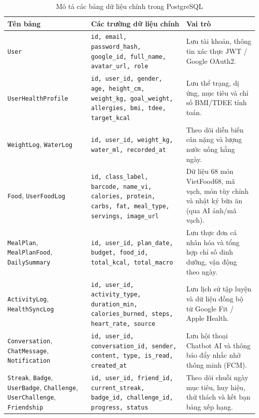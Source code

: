 \documentclass[../main.tex]{subfiles}
\begin{document}
\begin{table}[H]
    \centering
    \caption{Mô tả các bảng dữ liệu chính trong PostgreSQL}
    \label{tab:ch3_database}
    \begin{tabular}{|p{}|p{}|p{}|}
        \hline
        \rowcolor{primary!35}
        \textbf{Tên bảng} & \textbf{Các trường dữ liệu chính} & \textbf{Vai trò} \\
        \hline
        \texttt{User} & \texttt{id, email, password\_hash, google\_id, full\_name, avatar\_url, role} & Lưu tài khoản, thông tin xác thực JWT / Google OAuth2. \\
        \hline
        \texttt{UserHealthProfile} & \texttt{id, user\_id, gender, age, height\_cm, weight\_kg, goal\_weight, allergies, bmi, tdee, target\_kcal} & Lưu thể trạng, dị ứng, mục tiêu và chỉ số BMI/TDEE tính toán. \\
        \hline
        \texttt{WeightLog}, \texttt{WaterLog} & \texttt{id, user\_id, weight\_kg, water\_ml, recorded\_at} & Theo dõi diễn biến cân nặng và lượng nước uống hằng ngày. \\
        \hline
        \texttt{Food}, \texttt{UserFoodLog} & \texttt{id, class\_label, barcode, name\_vi, calories, protein, carbs, fat, meal\_type, servings, image\_url} & Dữ liệu 68 món VietFood68, mã vạch, món tùy chỉnh và nhật ký bữa ăn (qua AI ảnh/mã vạch). \\
        \hline
        \texttt{MealPlan}, \texttt{MealPlanFood}, \texttt{DailySummary} & \texttt{id, user\_id, plan\_date, budget, food\_id, total\_kcal, total\_macro} & Lưu thực đơn cá nhân hóa và tổng hợp chỉ số dinh dưỡng, vận động theo ngày. \\
        \hline
        \texttt{ActivityLog}, \texttt{HealthSyncLog} & \texttt{id, user\_id, activity\_type, duration\_min, calories\_burned, steps, heart\_rate, source} & Lưu lịch sử tập luyện và dữ liệu đồng bộ từ Google Fit / Apple Health. \\
        \hline
        \texttt{Conversation}, \texttt{ChatMessage}, \texttt{Notification} & \texttt{id, user\_id, conversation\_id, sender, content, type, is\_read, created\_at} & Lưu hội thoại Chatbot AI và thông báo đẩy nhắc nhở thông minh (FCM). \\
        \hline
        \texttt{Streak}, \texttt{Badge}, \texttt{UserBadge}, \texttt{Challenge}, \texttt{UserChallenge}, \texttt{Friendship} & \texttt{id, user\_id, friend\_id, current\_streak, badge\_id, challenge\_id, progress, status} & Theo dõi chuỗi ngày mục tiêu, huy hiệu, thử thách và kết bạn bảng xếp hạng. \\
        \hline
    \end{tabular}
\end{table}
\end{document}

